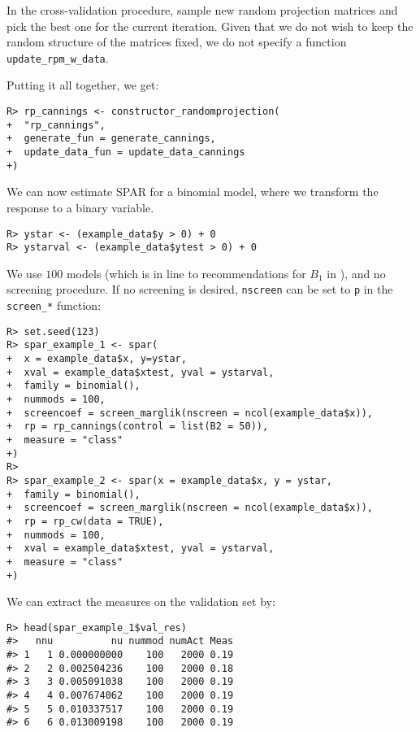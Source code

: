 \documentclass[
  article]{jss}
\begin{document}
In the cross-validation procedure, sample new random projection matrices
and pick the best one for the current iteration. Given that we do not
wish to keep the random structure of the matrices fixed, we do not
specify a function \texttt{update\_rpm\_w\_data}.

Putting it all together, we get:

\begin{verbatim}
R> rp_cannings <- constructor_randomprojection(
+  "rp_cannings",
+  generate_fun = generate_cannings,
+  update_data_fun = update_data_cannings
+)
\end{verbatim}

We can now estimate SPAR for a binomial model, where we transform the
response to a binary variable.

\begin{verbatim}
R> ystar <- (example_data$y > 0) + 0
R> ystarval <- (example_data$ytest > 0) + 0
\end{verbatim}

We use \(100\) models (which is in line to recommendations for \(B_1\)
in \citet{cannings2017random}), and no screening procedure. If no
screening is desired, \texttt{nscreen} can be set to \texttt{p} in the
\texttt{screen\_*} function:

\begin{verbatim}
R> set.seed(123)   
R> spar_example_1 <- spar(
+  x = example_data$x, y=ystar,
+  xval = example_data$xtest, yval = ystarval,
+  family = binomial(),
+  nummods = 100, 
+  screencoef = screen_marglik(nscreen = ncol(example_data$x)),
+  rp = rp_cannings(control = list(B2 = 50)),
+  measure = "class"
+)
R> 
R> spar_example_2 <- spar(x = example_data$x, y = ystar,
+  family = binomial(),
+  screencoef = screen_marglik(nscreen = ncol(example_data$x)),
+  rp = rp_cw(data = TRUE),
+  nummods = 100, 
+  xval = example_data$xtest, yval = ystarval,
+  measure = "class"
+)
\end{verbatim}

We can extract the measures on the validation set by:

\begin{verbatim}
R> head(spar_example_1$val_res)
#>   nnu          nu nummod numAct Meas
#> 1   1 0.000000000    100   2000 0.19
#> 2   2 0.002504236    100   2000 0.18
#> 3   3 0.005091038    100   2000 0.19
#> 4   4 0.007674062    100   2000 0.19
#> 5   5 0.010337517    100   2000 0.19
#> 6   6 0.013009198    100   2000 0.19
\end{verbatim}
\end{document}
